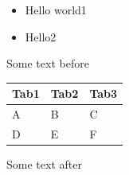 \documentclass[11pt,a4paper]{article}
\begin{document}
\begin{itemize}
\item Hello world1
\item Hello2
\end{itemize}

Some text before

\begin{table}[h]
\begin{tabular}{|l|l|l|}
\hline
Tab1 & Tab2 & Tab3 \\ \hline
A & B & C \\ \hline
D & E & F \\ \hline
\end{tabular}
\end{table}

Some text after
\end{document}
